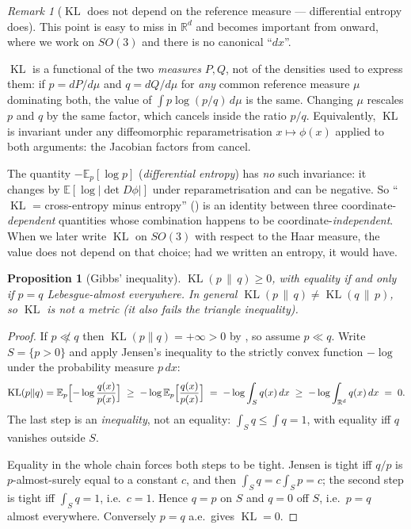 \documentclass[11pt,a4paper]{report}
\newtheorem{proposition}[proposition]{Proposition}
\theoremstyle{definition}
\theoremstyle{remark}
\newtheorem{remark}[remark]{Remark}
\DeclareMathOperator{\KL}{KL}
\newcommand{\RR}{\mathbb R}
\newcommand{\EE}{\mathbb E}
\begin{document}
\begin{remark}[$\KL$ does not depend on the reference measure --- differential entropy does]
\label{rem:kl-invariance}
This point is easy to miss in $\RR^d$ and becomes important from
 onward, where we work on $SO(3)$ and there is no canonical
``$dx$''.

$\KL$ is a functional of the two \emph{measures} $P,Q$, not of the densities
used to express them: if $p=dP/d\mu$ and $q=dQ/d\mu$ for \emph{any} common
reference measure $\mu$ dominating both, the value of
$\int p\log(p/q)\,d\mu$ is the same. Changing $\mu$ rescales $p$ and $q$ by
the same factor, which cancels inside the ratio $p/q$. Equivalently, $\KL$ is
invariant under any diffeomorphic reparametrisation $x\mapsto\phi(x)$ applied
to both arguments: the Jacobian factors from
 cancel.

The quantity $-\EE_p[\log p]$ (\emph{differential entropy}) has \emph{no} such
invariance: it changes by $\EE[\log|\det D\phi|]$ under reparametrisation and
can be negative. So ``$\KL$ = cross-entropy minus entropy''
() is an identity between three
coordinate-\emph{dependent} quantities whose combination happens to be
coordinate-\emph{independent}. When we later write $\KL$ on $SO(3)$ with
respect to the Haar measure, the value does not depend on that choice; had we
written an entropy, it would have.
\end{remark}

\begin{proposition}[Gibbs' inequality]
\label{prop:kl-properties}
$\KL(p\,\|\,q)\ge0$, with equality if and only if $p=q$ Lebesgue-almost
everywhere. In general $\KL(p\,\|\,q)\ne\KL(q\,\|\,p)$, so $\KL$ is
\emph{not} a metric (it also fails the triangle inequality).
\end{proposition}

\begin{proof}
If $p\not\ll q$ then $\KL(p\|q)=+\infty>0$ by , so assume
$p\ll q$. Write $S=\{p>0\}$ and apply Jensen's inequality to the strictly
convex function $-\log$ under the probability measure $p\,dx$:
\[
\KL(p\|q)
= \EE_{p}\Bigl[-\log\frac{q(x)}{p(x)}\Bigr]
\;\ge\; -\log \EE_{p}\Bigl[\frac{q(x)}{p(x)}\Bigr]
\;=\; -\log\int_{S} q(x)\,dx
\;\ge\; -\log\int_{\RR^d} q(x)\,dx
\;=\; 0 .
\]
The last step is an \emph{inequality}, not an equality: $\int_S q\le\int q=1$,
with equality iff $q$ vanishes outside $S$.

Equality in the whole chain forces both steps to be tight. Jensen is tight iff
$q/p$ is $p$-almost-surely equal to a constant $c$, and then
$\int_S q = c\int_S p = c$; the second step is tight iff $\int_S q=1$, i.e.\
$c=1$. Hence $q=p$ on $S$ and $q=0$ off $S$, i.e.\ $p=q$ almost everywhere.
Conversely $p=q$ a.e.\ gives $\KL=0$.
\end{proof}
\end{document}

